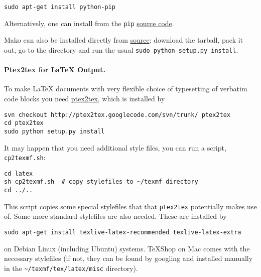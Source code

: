 \documentclass[%
oneside,                 %
final,                   %
10pt]{article}
\begin{document}
\vspace{4pt}
\begin{Verbatim}[numbers=none,frame=lines,label=\fbox{{\tiny Terminal}},fontsize=\fontsize{9pt}{9pt},
labelposition=topline,framesep=2.5mm,framerule=0.7pt]
sudo apt-get install python-pip
\end{Verbatim}
Alternatively, one can install from the {\fontsize{10pt}{10pt}\Verb!pip!} \href{{http://pypi.python.org/pypi/pip}}{source code}.

Mako can also be installed directly from
\href{{http://www.makotemplates.org/download.html}}{source}: download the
tarball, pack it out, go to the directory and run
the usual {\fontsize{10pt}{10pt}\Verb!sudo python setup.py install!}.

\paragraph{Ptex2tex for {\LaTeX} Output.}
To make {\LaTeX} documents with very flexible choice of typesetting of
verbatim code blocks you need \href{{http://code.google.com/p/ptex2tex}}{ptex2tex},
which is installed by

\vspace{4pt}
\begin{Verbatim}[numbers=none,frame=lines,label=\fbox{{\tiny Terminal}},fontsize=\fontsize{9pt}{9pt},
labelposition=topline,framesep=2.5mm,framerule=0.7pt]
svn checkout http://ptex2tex.googlecode.com/svn/trunk/ ptex2tex
cd ptex2tex
sudo python setup.py install
\end{Verbatim}
It may happen that you need additional style files, you can run
a script, {\fontsize{10pt}{10pt}\Verb!cp2texmf.sh!}:

\vspace{4pt}
\begin{Verbatim}[numbers=none,frame=lines,label=\fbox{{\tiny Terminal}},fontsize=\fontsize{9pt}{9pt},
labelposition=topline,framesep=2.5mm,framerule=0.7pt]
cd latex
sh cp2texmf.sh  # copy stylefiles to ~/texmf directory
cd ../..
\end{Verbatim}
This script copies some special stylefiles that
that {\fontsize{10pt}{10pt}\Verb!ptex2tex!} potentially makes use of. Some more standard stylefiles
are also needed. These are installed by

\vspace{4pt}
\begin{Verbatim}[numbers=none,frame=lines,label=\fbox{{\tiny Terminal}},fontsize=\fontsize{9pt}{9pt},
labelposition=topline,framesep=2.5mm,framerule=0.7pt]
sudo apt-get install texlive-latex-recommended texlive-latex-extra
\end{Verbatim}
on Debian Linux (including Ubuntu) systems. TeXShop on Mac comes with
the necessary stylefiles (if not, they can be found by googling and installed
manually in the {\fontsize{10pt}{10pt}\Verb!~/texmf/tex/latex/misc!} directory).
\end{document}
